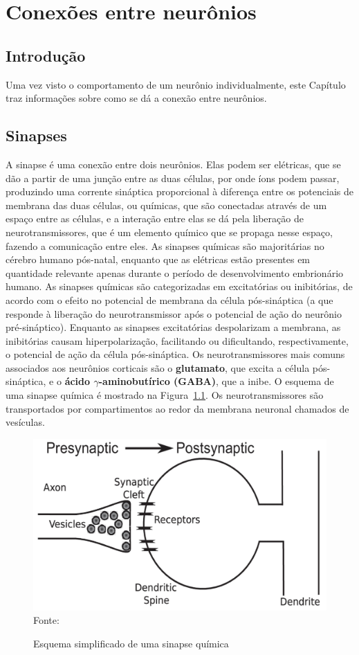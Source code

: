 \chapter{Conexões entre neurônios}\label{cap:conexoes}
\section{Introdução}\label{sec:conexoes_intro}
Uma vez visto o comportamento de um neurônio individualmente, este Capítulo traz informações sobre como se dá a conexão entre neurônios.
\section{Sinapses}\label{sec:sinapses}
A sinapse é uma conexão entre dois neurônios. Elas podem ser elétricas, que se dão a partir de uma junção entre as duas células, por onde íons podem passar, produzindo uma corrente sináptica proporcional à diferença entre os potenciais de membrana das duas células, ou químicas, que são conectadas através de um espaço entre as células, e a interação entre elas se dá pela liberação de neurotransmissores, que é um elemento químico que se propaga nesse espaço, fazendo a comunicação entre eles. As sinapses químicas são majoritárias no cérebro humano pós-natal, enquanto que as elétricas estão presentes em quantidade relevante apenas durante o período de desenvolvimento embrionário humano. As sinapses químicas são categorizadas em excitatórias ou inibitórias, de acordo com o efeito no potencial de membrana da célula pós-sináptica (a que responde à liberação do neurotransmissor após o potencial de ação do neurônio pré-sináptico). Enquanto as sinapses excitatórias despolarizam a membrana, as inibitórias causam hiperpolarização, facilitando ou dificultando, respectivamente, o potencial de ação da célula pós-sináptica. Os neurotransmissores mais comuns associados aos neurônios corticais são o \textbf{glutamato}, que excita a célula pós-sináptica, e o \textbf{ácido $\gamma$-aminobutírico (GABA)}, que a inibe.
O esquema de uma sinapse química é mostrado na Figura~\ref{fig:sinapses}. Os neurotransmissores são transportados por compartimentos ao redor da membrana neuronal chamados de vesículas.
\begin{figure}[tb]
	\centering
	\caption{Esquema simplificado de uma sinapse química}
	\label{fig:sinapses}
	\includegraphics[width=0.7\linewidth]{figs/sinapses}\\
	\small{Fonte: \cite{miller_introductory_2018}}
\end{figure}

